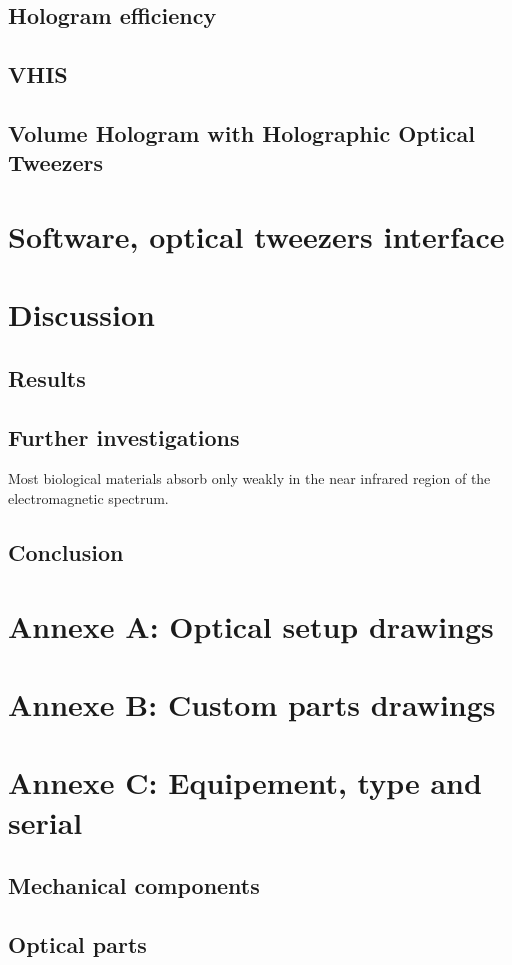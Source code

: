 \documentclass{kepfl}
\begin{document}
\section{Hologram efficiency}
\section{VHIS}
\section{Volume Hologram with Holographic Optical Tweezers}

\chapter{Software, optical tweezers interface}

\chapter{Discussion}
\section{Results}
\section{Further investigations}
Most biological materials absorb only weakly in the near infrared region of the electromagnetic spectrum. 
\section{Conclusion}

\chapter{Annexe A: Optical setup drawings}
\chapter{Annexe B: Custom parts drawings}
\chapter{Annexe C: Equipement, type and serial}
\section{Mechanical components}
\section{Optical parts}
\end{document}
